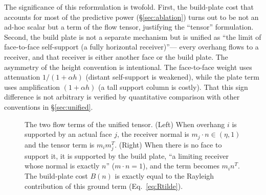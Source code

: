 \documentclass[11pt,a4paper]{article}
\begin{document}
The significance of this reformulation is twofold.
First, the build-plate cost that accounts for most of the predictive power (\S\ref{sec:ablation})
turns out to be not an ad-hoc scalar but a term of the flow tensor, justifying the ``tensor'' formulation.
Second, the build plate is not a separate mechanism but is unified as
``the limit of face-to-face self-support (a fully horizontal receiver)''---
every overhang flows to a receiver, and that receiver is either another face or the build plate.
The asymmetry of the height convention is intentional.
The face-to-face weight uses attenuation $1/(1+\alpha h)$ (distant self-support is weakened),
while the plate term uses amplification $(1+\alpha h)$ (a tall support column is costly).
That this sign difference is not arbitrary is verified by quantitative comparison with other conventions in \S\ref{sec:unified}.

\begin{figure}[H]
\centering
{}
\caption{The two flow terms of the unified tensor. (Left) When overhang $i$ is supported by an actual face $j$, the receiver normal is
$m_j\cdot n\in(\eta,1)$ and the tensor term is $m_im_j^T$. (Right) When there is no face to support it,
it is supported by the build plate, ``a limiting receiver whose normal is exactly $n$'' ($m\cdot n=1$), and the term becomes $m_in^T$.
The build-plate cost $B(n)$ is exactly equal to the Rayleigh contribution of this ground term (Eq.~\eqref{eq:Rtilde}).}
\label{fig:unified-flow}
\end{figure}
\end{document}
